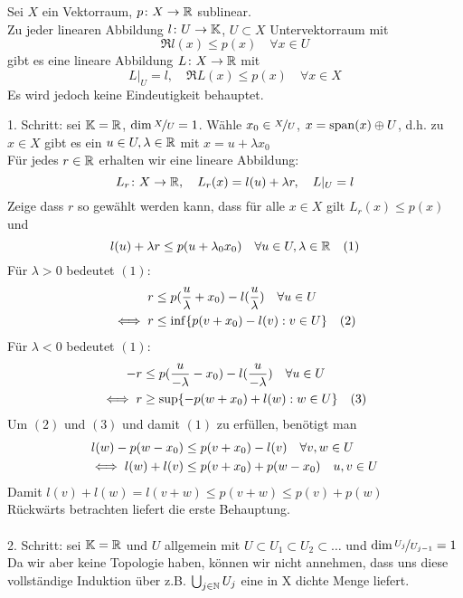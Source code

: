 \begin{satz}  \label{satz:20.2-HahnBanach}
		Sei $X$ ein Vektorraum, $p \colon X \rightarrow \mathbb{R}$ sublinear. \\
		Zu jeder linearen Abbildung $l \colon U \rightarrow \mathbb{K}$, $U \subset X$ Untervektorraum mit
			\[ \Re l(x) \leq p(x) \quad \forall x \in U \]
		gibt es eine lineare Abbildung $L \colon X \rightarrow \mathbb{R}$ mit 
			\[ L|_{U} = l, \quad \Re  L(x) \leq p(x) \quad \forall x \in X \]
		Es wird jedoch keine Eindeutigkeit behauptet.
\end{satz}

\begin{beweis}
	1. Schritt: sei $\mathbb{K} = \mathbb{R}$, $\dim \nicefrac{X}{U} = 1$. Wähle $x_{0} \in \nicefrac{X}{U}$, $x = \operatorname{span}(x) \oplus U$, d.h. zu $x \in X$ gibt es ein $u \in U, \lambda \in \mathbb{R}$ mit $x = u + \lambda x_{0}$ \\
	Für jedes $r \in \mathbb{R}$ erhalten wir eine lineare Abbildung:
	\[ L_{r} \colon X \rightarrow \mathbb{R}, \quad L_{r} (x) = l(u) + \lambda r, \quad L|_{U} = l \]
	Zeige dass $r$ so gewählt werden kann, dass für alle $x \in X$ gilt $L_{r}(x) \leq p(x)$ und 
	\[ l(u) + \lambda r \leq p(u + \lambda_{0} x_{0}) \quad \forall u \in U, \lambda \in \mathbb{R} \quad (1) \label{eq:20.2.5-1} \]
	Für $\lambda > 0$ bedeutet \hyperref[eq:20.2.5-1]{$(1)$}:
	\begin{align*}
		r & \leq p(\frac{u}{\lambda} + x_{0}) - l(\frac{u}{\lambda}) \quad \forall u \in U \\
		\iff r & \leq \inf \{ p( v + x_{0}) - l(v) : v \in U \} \quad (2) \label{eq:20.2.5-2}
	\end{align*}
	Für $\lambda < 0$ bedeutet \hyperref[eq:20.2.5-1]{$(1)$}:
	\begin{align*}
		- r & \leq p(\frac{u}{- \lambda} - x_{0}) - l(\frac{u}{- \lambda}) \quad \forall u \in U \\
		\iff r & \geq \sup \{ - p( w + x_{0}) + l(w) : w \in U \} \quad (3) \label{eq:20.2.5-3}
	\end{align*}
	Um \hyperref[eq:20.2.5-2]{$(2)$} und \hyperref[eq:20.2.5-3]{$(3)$} und damit \hyperref[eq:20.2.5-1]{$(1)$} zu erfüllen, benötigt man
	\begin{align*}
		l(w) - p(w - x_{0}) & \leq p(v + x_{0}) - l(v) \quad \forall v, w \in U \\
		\iff l(w) + l(v) & \leq p(v + x_{0}) + p(w - x_{0}) \quad u, v \in U
	\end{align*}
	Damit $l(v) + l(w) = l(v + w) \leq p(v + w) \leq p(v) + p(w)$ \\
	Rückwärts betrachten liefert die erste Behauptung. \\ \\
	2. Schritt: sei $\mathbb{K} = \mathbb{R}$ und $U$ allgemein mit $U \subset U_{1} \subset U_{2} \subset \dotsc$ und $\dim \nicefrac{U_{j}}{U_{j - 1}} = 1$ \\
	Da wir aber keine Topologie haben, können wir nicht annehmen, dass uns diese vollständige Induktion über z.B. $\bigcup_{j \in \mathbb{N}} U_{j}$ eine in X dichte Menge liefert.
\end{beweis}



\newpage